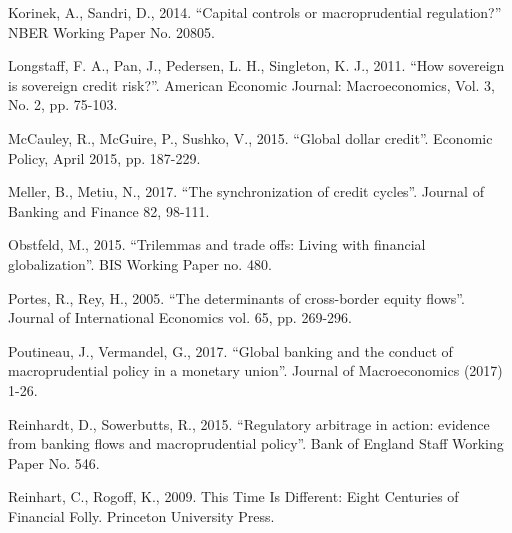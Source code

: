 \documentclass[12pt,a4paper]{article}
\begin{document}
Korinek, A., Sandri, D., 2014. “Capital controls or macroprudential regulation?” NBER Working Paper No. 20805.

Longstaff, F. A., Pan, J., Pedersen, L. H., Singleton, K. J., 2011. “How sovereign is sovereign credit risk?”. American Economic Journal: Macroeconomics, Vol. 3, No. 2, pp. 75-103.

McCauley, R., McGuire, P., Sushko, V., 2015. “Global dollar credit”. Economic Policy, April 2015, pp. 187-229.


Meller, B., Metiu, N., 2017. “The synchronization of credit cycles”. Journal of Banking and Finance 82, 98-111.


Obstfeld, M., 2015. “Trilemmas and trade offs: Living with financial globalization”. BIS Working Paper no. 480. 



Portes, R., Rey, H., 2005. “The determinants of cross-border equity flows”. Journal of International Economics vol. 65, pp. 269-296.

Poutineau, J., Vermandel, G., 2017. “Global banking and the conduct of macroprudential policy in a monetary union”. Journal of Macroeconomics (2017) 1-26.


Reinhardt, D., Sowerbutts, R., 2015. “Regulatory arbitrage in action: evidence from banking flows and macroprudential policy”. Bank of England Staff Working Paper No. 546.

Reinhart, C., Rogoff, K., 2009. This Time Is Different: Eight Centuries of Financial Folly. Princeton University Press.

\end{document}
